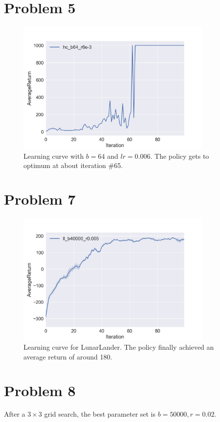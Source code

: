 \documentclass[12pt]{article}
\begin{document}
\section{Problem 5}

\begin{figure}[!h]
\centering
\includegraphics[width=3.8in]{Figure_3.png}
\caption{Learning curve with $b = 64$ and $lr = 0.006$. The policy gets to optimum at about iteration \#65.}
\end{figure}

\section{Problem 7}

\begin{figure}[!h]
\centering
\includegraphics[width=3.8in]{Figure_4.png}
\caption{Learning curve for LunarLander. The policy finally achieved an average return of around 180.}
\end{figure}

\section{Problem 8}
After a $3 \times 3$ grid search, the best parameter set is $b = 50000, r = 0.02$.
\end{document}
